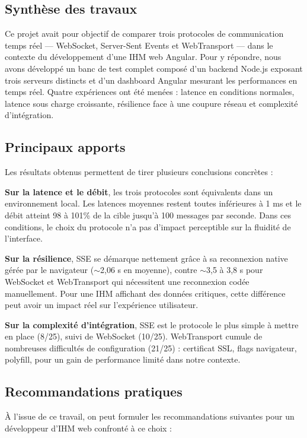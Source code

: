 \subsection{Synthèse des travaux}

Ce projet avait pour objectif de comparer trois protocoles de communication temps réel --- WebSocket, Server-Sent Events et WebTransport --- dans le contexte du développement d'une IHM web Angular. Pour y répondre, nous avons développé un banc de test complet composé d'un backend Node.js exposant trois serveurs distincts et d'un dashboard Angular mesurant les performances en temps réel. Quatre expériences ont été menées : latence en conditions normales, latence sous charge croissante, résilience face à une coupure réseau et complexité d'intégration.

\subsection{Principaux apports}

Les résultats obtenus permettent de tirer plusieurs conclusions concrètes :

\textbf{Sur la latence et le débit}, les trois protocoles sont équivalents dans un environnement local. Les latences moyennes restent toutes inférieures à 1 ms et le débit atteint 98 à 101\% de la cible jusqu'à 100 messages par seconde. Dans ces conditions, le choix du protocole n'a pas d'impact perceptible sur la fluidité de l'interface.

\textbf{Sur la résilience}, SSE se démarque nettement grâce à sa reconnexion native gérée par le navigateur ($\sim$2,06 s en moyenne), contre $\sim$3,5 à 3,8 s pour WebSocket et WebTransport qui nécessitent une reconnexion codée manuellement. Pour une IHM affichant des données critiques, cette différence peut avoir un impact réel sur l'expérience utilisateur.

\textbf{Sur la complexité d'intégration}, SSE est le protocole le plus simple à mettre en place (8/25), suivi de WebSocket (10/25). WebTransport cumule de nombreuses difficultés de configuration (21/25) : certificat SSL, flags navigateur, polyfill, pour un gain de performance limité dans notre contexte.

\subsection{Recommandations pratiques}

À l'issue de ce travail, on peut formuler les recommandations suivantes pour un développeur d'IHM web confronté à ce choix :

